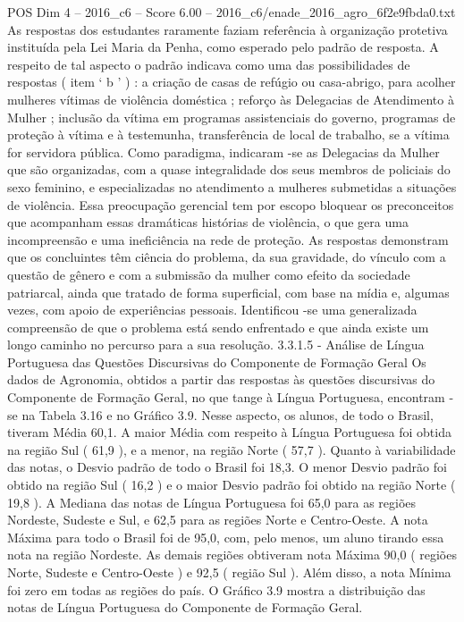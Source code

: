 \begin{textsample}{POS Dim 4 – 2016\_c6 – Score 6.00 – 2016\_c6/enade\_2016\_agro\_6f2e9fbda0.txt}
As respostas dos estudantes raramente faziam referência à organização protetiva instituída pela Lei Maria da Penha, como esperado pelo padrão de resposta.
A respeito de tal aspecto o padrão indicava como uma das possibilidades de respostas ( item ‘ b ’ ) : a criação de casas de refúgio ou casa-abrigo, para acolher mulheres vítimas de violência doméstica ; reforço às Delegacias de Atendimento à Mulher ; inclusão da vítima em programas assistenciais do governo, programas de proteção à vítima e à testemunha, transferência de local de trabalho, se a vítima for servidora pública.
Como paradigma, indicaram -se as Delegacias da Mulher que são organizadas, com a quase integralidade dos seus membros de policiais do sexo feminino, e especializadas no atendimento a mulheres submetidas a situações de violência.
Essa preocupação gerencial tem por escopo bloquear os preconceitos que acompanham essas dramáticas histórias de violência, o que gera uma incompreensão e uma ineficiência na rede de proteção.
As respostas demonstram que os concluintes têm ciência do problema, da sua gravidade, do vínculo com a questão de gênero e com a submissão da mulher como efeito da sociedade patriarcal, ainda que tratado de forma superficial, com base na mídia e, algumas vezes, com apoio de experiências pessoais.
Identificou -se uma generalizada compreensão de que o problema está sendo enfrentado e que ainda existe um longo caminho no percurso para a sua resolução. 3.3.1.5 - Análise de Língua Portuguesa das Questões Discursivas do Componente de Formação Geral Os dados de Agronomia, obtidos a partir das respostas às questões discursivas do Componente de Formação Geral, no que tange à Língua Portuguesa, encontram -se na Tabela 3.16 e no Gráfico 3.9.
Nesse aspecto, os alunos, de todo o Brasil, tiveram Média 60,1.
A maior Média com respeito à Língua Portuguesa foi obtida na região Sul ( 61,9 ), e a menor, na região Norte ( 57,7 ).
Quanto à variabilidade das notas, o Desvio padrão de todo o Brasil foi 18,3.
O menor Desvio padrão foi obtido na região Sul ( 16,2 ) e o maior Desvio padrão foi obtido na região Norte ( 19,8 ).
A Mediana das notas de Língua Portuguesa foi 65,0 para as regiões Nordeste, Sudeste e Sul, e 62,5 para as regiões Norte e Centro-Oeste.
A nota Máxima para todo o Brasil foi de 95,0, com, pelo menos, um aluno tirando essa nota na região Nordeste.
As demais regiões obtiveram nota Máxima 90,0 ( regiões Norte, Sudeste e Centro-Oeste ) e 92,5 ( região Sul ).
Além disso, a nota Mínima foi zero em todas as regiões do país.
O Gráfico 3.9 mostra a distribuição das notas de Língua Portuguesa do Componente de Formação Geral.

\end{textsample}
